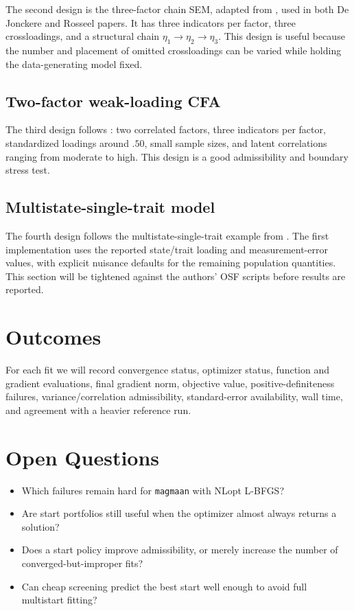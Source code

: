 \documentclass[11pt]{article}
\newcommand{\magmaan}{\texttt{magmaan}}
\begin{document}
The second design is the three-factor chain SEM, adapted from
\citet{chen2001improper}, used in both De Jonckere and Rosseel papers. It has
three indicators per factor, three crossloadings, and a structural chain
$\eta_1 \rightarrow \eta_2 \rightarrow \eta_3$. This design is useful because
the number and placement of omitted crossloadings can be varied while holding
the data-generating model fixed.

\subsection{Two-factor weak-loading CFA}

The third design follows \citet{ludtke2021pmlmcmc}: two correlated factors,
three indicators per factor, standardized loadings around $.50$, small sample
sizes, and latent correlations ranging from moderate to high. This design is a
good admissibility and boundary stress test.

\subsection{Multistate-single-trait model}

The fourth design follows the multistate-single-trait example from
\citet{dejonckere2025randomstarts}. The first implementation uses the reported
state/trait loading and measurement-error values, with explicit nuisance
defaults for the remaining population quantities. This section will be tightened
against the authors' OSF scripts before results are reported.

\section{Outcomes}

For each fit we will record convergence status, optimizer status, function and
gradient evaluations, final gradient norm, objective value, positive-definiteness
failures, variance/correlation admissibility, standard-error availability, wall
time, and agreement with a heavier reference run.

\section{Open Questions}

\begin{itemize}
\item Which failures remain hard for \magmaan{} with NLopt L-BFGS?
\item Are start portfolios still useful when the optimizer almost always
  returns a solution?
\item Does a start policy improve admissibility, or merely increase the number
  of converged-but-improper fits?
\item Can cheap screening predict the best start well enough to avoid full
  multistart fitting?
\end{itemize}



\end{document}
